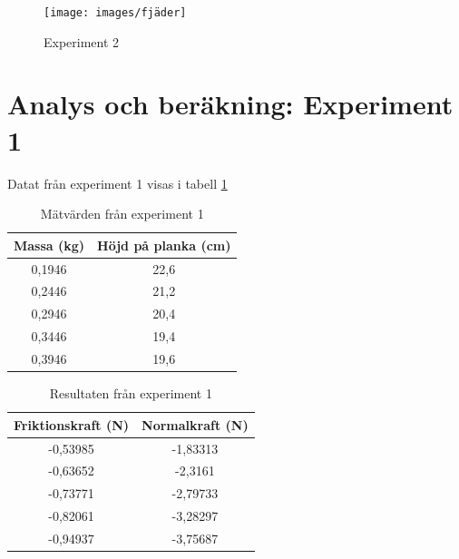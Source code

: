 \documentclass[11p, titlepage, oneside, a4paper]{article}
\begin{document}
        \begin{figure}[!h]
            \texttt{[image: images/fjäder]}
            \caption{Experiment 2}
            \label{fig:fjäder}
        \end{figure}

    \newpage
	\section{Analys och beräkning: Experiment 1}
        Datat från experiment 1 visas i tabell \ref{table:result}
        
        \begin{table}
            \begin{center}
            \begin{tabular}{ |c|c| } 
                \hline
                Massa (kg) & Höjd på planka (cm)  \\
                \hline
                0,1946 & 22,6 \\
                0,2446 & 21,2 \\
                0,2946 & 20,4 \\
                0,3446 & 19,4 \\
                0,3946 & 19,6 \\
                \hline
            \end{tabular}
                \caption{Mätvärden från experiment 1}
                \label{table:result}
            \end{center}
        \end{table}

\begin{table}
    \begin{center}
        \begin{tabular}{ |c|c| }
            \hline
            Friktionskraft (N) & Normalkraft (N)  \\
            \hline
            -0,53985 & -1,83313 \\
            -0,63652 & -2,3161 \\
            -0,73771 & -2,79733 \\
            -0,82061 & -3,28297 \\
            -0,94937 & -3,75687 \\
            \hline
        \end{tabular}
        \caption{Resultaten från experiment 1}
        \label{table:result1.1}
    \end{center}
\end{table}
\end{document}
